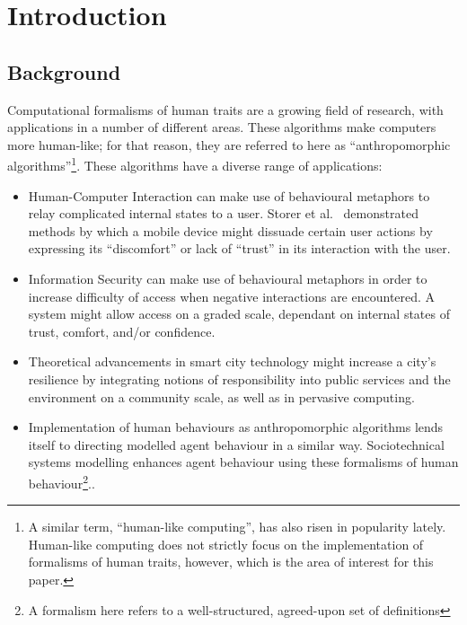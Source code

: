 \section{Introduction}


\subsection{Background}

Computational formalisms of human traits are a growing field of research, with applications in a number of different areas. These algorithms make computers more human-like; for that reason, they are referred to here as ``anthropomorphic algorithms''\footnote{A similar term, ``human-like computing'', has also risen in popularity lately. Human-like computing does not strictly focus on the implementation of formalisms of human traits, however, which is the area of interest for this paper.}. These algorithms have a diverse range of applications:

\begin{itemize}
  \item Human-Computer Interaction can make use of behavioural metaphors to relay complicated internal states to a user. Storer et al.~\cite{storer_mobile_behaviour_poster} demonstrated methods by which a mobile device might dissuade certain user actions by expressing its ``discomfort'' or lack of ``trust'' in its interaction with the user.
  \item Information Security can make use of behavioural metaphors in order to increase difficulty of access when negative interactions are encountered. A system might allow access on a graded scale, dependant on internal states of trust, comfort, and/or confidence.
  \item Theoretical advancements in smart city technology might increase a city's resilience by integrating notions of responsibility into public services and the environment on a community scale, as well as in pervasive computing\cite{wallis_talk_about_x_talk}.\par
  \item Implementation of human behaviours as anthropomorphic algorithms lends itself to directing modelled agent behaviour in a similar way. Sociotechnical systems modelling enhances agent behaviour using these formalisms of human behaviour\footnote{A formalism here refers to a well-structured, agreed-upon set of definitions}.\cite{Marsh1994FormalisingConcept}.
\end{itemize}

